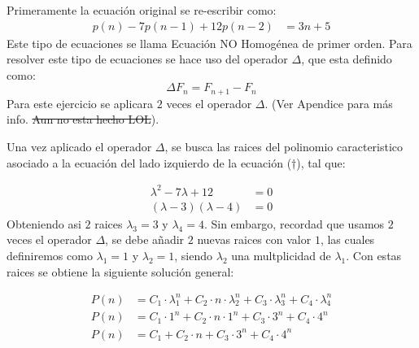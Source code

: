 \begin{solution}
Primeramente la ecuación original se re-escribir como:
\begin{align*}
    p(n)-7p(n-1) +12p(n-2) &=3n +5 \tag{$\dagger$}
\end{align*}
Este tipo de ecuaciones se llama Ecuación NO Homogénea de primer orden. Para resolver este tipo de ecuaciones se hace uso del operador $\Delta$, que esta definido como:
$$\Delta F_n = F_{n+1} - F_n$$
Para este ejercicio se aplicara $2$ veces el operador $\Delta$.
(Ver Apendice para más info. \st{Aun no esta hecho LOL}).

Una vez aplicado el operador $\Delta$, se busca las raices del polinomio caracteristico asociado a la ecuación  del lado izquierdo de la ecuación ($\dagger$), tal que:

\begin{align*}
    \lambda^2 -7\lambda + 12 &= 0\\
    (\lambda -3)(\lambda -4)&= 0
\end{align*}
Obteniendo asi $2$ raices $\lambda_3 = 3$ y $\lambda_4 = 4$. Sin embargo, recordad que usamos $2$ veces el operador $\Delta$, se debe añadir $2$ nuevas raices con valor $1$, las cuales definiremos como $\lambda_1 =1$ y $\lambda_2 = 1$, siendo $\lambda_2$ una multplicidad de $\lambda_1$.
Con estas raices se obtiene la siguiente solución general:

\begin{align*}
    P(n) &= C_1 \cdot \lambda_1^n + C_2 \cdot n \cdot \lambda_2^n + C_3 \cdot \lambda_3^n + C_4 \cdot \lambda_4^n\\
    P(n) &= C_1 \cdot 1^n + C_2 \cdot n \cdot 1^n + C_3 \cdot 3^n + C_4 \cdot 4^n\\
    P(n) &= C_1+ C_2 \cdot n + C_3 \cdot 3^n + C_4 \cdot 4^n \tag{$\star$}
\end{align*}


\end{solution}
